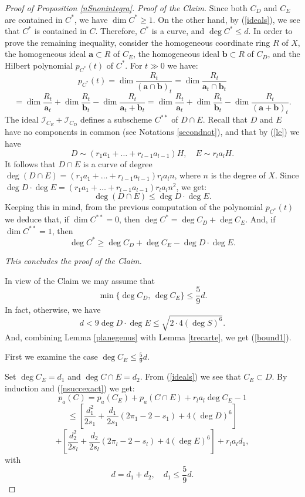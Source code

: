 \documentclass[9pt,a4paper]{amsart}
\theoremstyle{plain}
\theoremstyle{definition}
\theoremstyle{remark}
\begin{document}
\begin{proof}[Proof of Proposition \ref{nSnonintegra}]
\smallskip
{\it Proof of the Claim.} Since both $C_D$ and $C_E$ are contained
in $C^*$, we have $\dim C^*\geq 1$. On the other hand, by
(\ref{ideals}), we see that $C^*$ is contained in $C$. Therefore,
$C^*$ is a curve, and $\deg C^*\leq d$. In order to prove the
remaining inequality,  consider the homogeneous coordinate ring $R$
of  $X$, the homogeneous ideal $\mathbf a\subset R$ of ${C_E}$, the
homogeneous ideal $\mathbf b\subset R$ of $C_D$, and the Hilbert
polynomial $p_{C^*}(t)$ of $C^*$. For $t\gg 0$ we have:
$$
p_{C^*}(t)=\dim \frac{R_t}{(\mathbf a\cap\mathbf b)_t}=\dim
\frac{R_t}{\mathbf a_t\cap\mathbf b_t}
$$
$$
=\dim \frac{R_t}{\mathbf a_t}+\dim \frac{R_t}{\mathbf b_t}-\dim
\frac{R_t}{\mathbf a_t+\mathbf b_t}= \dim \frac{R_t}{\mathbf
a_t}+\dim \frac{R_t}{\mathbf b_t}-\dim \frac{R_t}{(\mathbf a+\mathbf
b)_t}.
$$
The ideal $\mathcal I_{C_E}+\mathcal I_{C_D}$ defines a subscheme
$C^{**}$ of $D\cap E$.
Recall  that $D$ and $E$ have no components in common (see Notations \ref{secondnot}), and that by (\ref{le}) we have
$$
D\sim (r_1a_1+\dots+r_{l-1}a_{l-1})H, \quad E\sim r_la_lH.
$$
It follows that
$D\cap E$ is a curve of degree $\deg (D\cap E)=(r_1a_1+\dots+r_{l-1}a_{l-1})r_la_ln$,
where $n$ is the degree of $X$. Since $\deg D\cdot\deg E=(r_1a_1+\dots+r_{l-1}a_{l-1})r_la_ln^2$, we get:
$$
\deg (D\cap E)\leq\deg D\cdot\deg E.
$$
Keeping this in mind, from the previous computation of the polynomial $p_{C^*}(t)$ we deduce
that, if $\dim C^{**}=0$, then  $\deg C^* = \deg C_D+\deg C_E$. And,
if $\dim C^{**}=1$, then  $$\deg C^*\geq \deg C_D+\deg C_E-\deg
D\cdot\deg E.$$

\smallskip
{\it This concludes the proof of the Claim.}

\smallskip
In view of the Claim we may assume that
$$
\min\{\deg C_D,\, \deg C_E\}\leq \frac{5}{9}d.
$$
In fact, otherwise, we have
$$
d< 9\deg D\cdot\deg E\leq \sqrt{2\cdot 4(\deg S)^6}.
$$
And, combining Lemma \ref{planegenus} with Lemma \ref{trecarte}, we
get (\ref{bound1}).

\smallskip
First we examine the case $\deg C_E\leq \frac{5}{9}d$.

Set $\deg C_E=d_1$ and $\deg C\cap E=d_2$. From (\ref{ideals}) we
see that $C_E\subset D$. By induction and (\ref{nsuccexact}) we get:
\begin{equation}\label{CE}
p_a(C)=p_a(C_E)+p_a(C\cap E)+r_la_l\deg C_E-1
\end{equation}
$$
\leq \left[\frac{d_1^2}{2s_1}+\frac{d_1}{2s_1}(2\pi_1-2-s_1)+4(\deg
D)^6\right]
$$
$$
+ \left[\frac{d_2^2}{2s_l}+\frac{d_2}{2s_l}(2\pi_l-2-s_l)+4(\deg
E)^6\right]+r_la_ld_1,
$$
with
$$
d=d_1+d_2,\quad d_1\leq \frac{5}{9}d.
$$


\end{proof}
\end{document}
